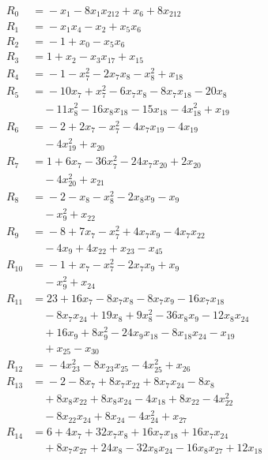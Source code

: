 \begingroup\footnotesize
\setlength{\jot}{2pt}\allowdisplaybreaks[4]
\begin{align*}
R_{0} &={} -x_{1} -8x_{1}x_{212} +x_{6} +8x_{212} \\
R_{1} &={} -x_{1}x_{4} -x_{2} +x_{5}x_{6} \\
R_{2} &={} -1 +x_{0} -x_{5}x_{6} \\
R_{3} &={} 1 +x_{2} -x_{3}x_{17} +x_{15} \\
R_{4} &={} -1 -x_{7}^{2} -2x_{7}x_{8} -x_{8}^{2} +x_{18} \\
R_{5} &={} -10x_{7} +x_{7}^{2} -6x_{7}x_{8} -8x_{7}x_{18} -20x_{8} \\
&\quad{} -11x_{8}^{2} -16x_{8}x_{18} -15x_{18} -4x_{18}^{2} +x_{19} \\
R_{6} &={} -2 +2x_{7} -x_{7}^{2} -4x_{7}x_{19} -4x_{19} \\
&\quad{} -4x_{19}^{2} +x_{20} \\
R_{7} &={} 1 +6x_{7} -36x_{7}^{2} -24x_{7}x_{20} +2x_{20} \\
&\quad{} -4x_{20}^{2} +x_{21} \\
R_{8} &={} -2 -x_{8} -x_{8}^{2} -2x_{8}x_{9} -x_{9} \\
&\quad{} -x_{9}^{2} +x_{22} \\
R_{9} &={} -8 +7x_{7} -x_{7}^{2} +4x_{7}x_{9} -4x_{7}x_{22} \\
&\quad{} -4x_{9} +4x_{22} +x_{23} -x_{45} \\
R_{10} &={} -1 +x_{7} -x_{7}^{2} -2x_{7}x_{9} +x_{9} \\
&\quad{} -x_{9}^{2} +x_{24} \\
R_{11} &={} 23 +16x_{7} -8x_{7}x_{8} -8x_{7}x_{9} -16x_{7}x_{18} \\
&\quad{} -8x_{7}x_{24} +19x_{8} +9x_{8}^{2} -36x_{8}x_{9} -12x_{8}x_{24} \\
&\quad{} +16x_{9} +8x_{9}^{2} -24x_{9}x_{18} -8x_{18}x_{24} -x_{19} \\
&\quad{} +x_{25} -x_{30} \\
R_{12} &={} -4x_{23}^{2} -8x_{23}x_{25} -4x_{25}^{2} +x_{26} \\
R_{13} &={} -2 -8x_{7} +8x_{7}x_{22} +8x_{7}x_{24} -8x_{8} \\
&\quad{} +8x_{8}x_{22} +8x_{8}x_{24} -4x_{18} +8x_{22} -4x_{22}^{2} \\
&\quad{} -8x_{22}x_{24} +8x_{24} -4x_{24}^{2} +x_{27} \\
R_{14} &={} 6 +4x_{7} +32x_{7}x_{8} +16x_{7}x_{18} +16x_{7}x_{24} \\
&\quad{} +8x_{7}x_{27} +24x_{8} -32x_{8}x_{24} -16x_{8}x_{27} +12x_{18} \\

\end{align*}
